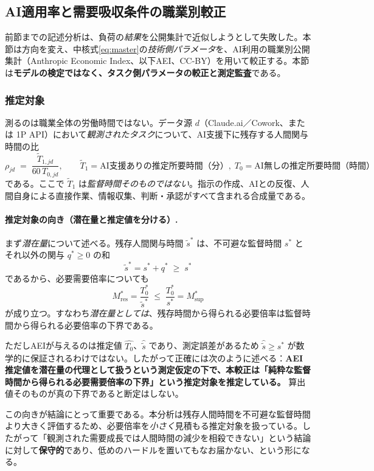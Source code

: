 \documentclass[11pt]{article}
\theoremstyle{plain}
\theoremstyle{definition}
\theoremstyle{remark}
\begin{document}
\subsection{AI適用率と需要吸収条件の職業別較正}\label{sec:aei}

前節までの記述分析は、負荷の\emph{結果}を公開集計で近似しようとして失敗した。本節は方向を変え、中核式\eqref{eq:master}の\emph{技術側パラメータ}を、AI利用の職業別公開集計（Anthropic Economic Index、以下AEI、CC-BY）を用いて較正する。本節は\textbf{モデルの検定ではなく、タスク側パラメータの較正と測定監査}である。

\subsubsection{推定対象}
測るのは職業全体の労働時間ではない。データ源 $d$（Claude.ai／Cowork、または 1P API）において\emph{観測されたタスク}について、AI支援下に残存する人間関与時間の比
\begin{equation}\label{eq:rho}
\rho_{jd}\;=\;\frac{\tilde T_{1,jd}}{60\,T_{0,jd}},
\qquad
\tilde T_1=\text{AI支援ありの推定所要時間（分）},\;
T_0=\text{AI無しの推定所要時間（時間）}
\end{equation}
である。ここで $\tilde T_1$ は\emph{監督時間そのものではない}。指示の作成、AIとの反復、人間自身による直接作業、情報収集、判断・承認がすべて含まれる合成量である。

\paragraph{推定対象の向き（潜在量と推定値を分ける）.}
まず\emph{潜在量}について述べる。残存人間関与時間 $\tilde s^{*}$ は、不可避な監督時間 $s^{*}$ とそれ以外の関与 $q^{*}\ge0$ の和
\[
\tilde s^{*}=s^{*}+q^{*}\;\ge\;s^{*}
\]
であるから、必要需要倍率についても
\[
M^{*}_{\mathrm{res}}=\frac{T_0^{*}}{\tilde s^{*}}\;\le\;\frac{T_0^{*}}{s^{*}}=M^{*}_{\mathrm{sup}}
\]
が成り立つ。すなわち\emph{潜在量としては}、残存時間から得られる必要倍率は監督時間から得られる必要倍率の下界である。

ただしAEIが与えるのは推定値 $\widehat{T_0}$、$\widehat{\tilde s}$ であり、測定誤差があるため $\widehat{\tilde s}\ge s^{*}$ が数学的に保証されるわけではない。したがって正確には次のように述べる：\textbf{AEI推定値を潜在量の代理として扱うという測定仮定の下で、本較正は「純粋な監督時間から得られる必要需要倍率の下界」という推定対象を推定している。} 算出値そのものが真の下界であると断定はしない。

この向きが結論にとって重要である。本分析は残存人間時間を不可避な監督時間より大きく評価するため、必要倍率を\emph{小さく}見積もる推定対象を扱っている。したがって「観測された需要成長では人間時間の減少を相殺できない」という結論に対して\textbf{保守的}であり、低めのハードルを置いてもなお届かない、という形になる。
\end{document}
